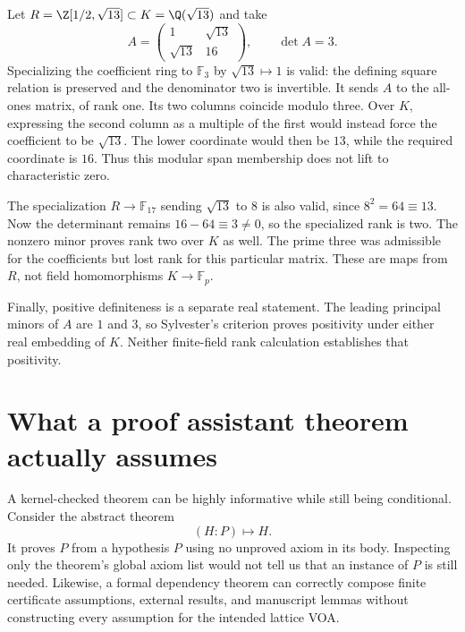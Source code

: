 \begin{example}
\label{ex:verification-modular-rank}
Let $R=\Z[1/2,\sqrt{13}]\subset K=\Q(\sqrt{13})$ and take
\[
 A=\begin{pmatrix}1&\sqrt{13}\\\sqrt{13}&16\end{pmatrix},
 \qquad \det A=3.
\]
Specializing the coefficient ring to $\mathbb F_3$ by
$\sqrt{13}\mapsto1$ is valid: the defining square relation
is preserved and the denominator two is invertible. It sends
$A$ to the all-ones matrix, of rank one.
Its two columns coincide modulo three.
Over $K$, expressing the second column as a multiple of the
first would instead force the coefficient to be $\sqrt{13}$.
The lower coordinate would then be $13$, while the required
coordinate is $16$. Thus this modular span membership does
not lift to characteristic zero.

The specialization $R\to\mathbb F_{17}$ sending
$\sqrt{13}$ to $8$ is also valid, since $8^2=64\equiv13$.
Now the determinant remains $16-64\equiv3\ne0$, so the
specialized rank is two. The nonzero minor proves rank two
over $K$ as well. The prime three was admissible for the
coefficients but lost rank for this particular matrix.
These are maps from $R$, not field homomorphisms
$K\to\mathbb F_p$.

Finally, positive definiteness is a separate real statement.
The leading principal minors of $A$ are $1$ and $3$, so
Sylvester's criterion proves positivity under either real
embedding of $K$. Neither finite-field rank calculation
establishes that positivity.
\end{example}

\section{What a proof assistant theorem actually assumes}

A kernel-checked theorem can be highly informative while still
being conditional. Consider the abstract theorem
\[
 (H:P)\longmapsto H.
\]
It proves $P$ from a hypothesis $P$ using no unproved axiom in
its body. Inspecting only the theorem's global axiom list would
not tell us that an instance of $P$ is still needed.
Likewise, a formal dependency theorem can correctly compose
finite certificate assumptions, external results, and manuscript
lemmas without constructing every assumption for the intended
lattice VOA.

